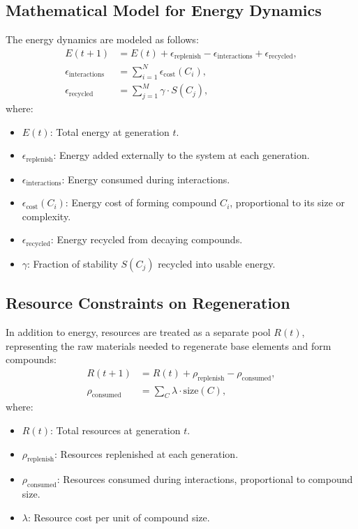 \documentclass[entropy,article,submit,pdftex,moreauthors]{Definitions/mdpi}
\begin{document}
\subsection{Mathematical Model for Energy Dynamics}

The energy dynamics are modeled as follows:
\begin{align}
E(t+1) &= E(t) + \epsilon_{\text{replenish}} - \epsilon_{\text{interactions}} + \epsilon_{\text{recycled}}, \\
\epsilon_{\text{interactions}} &= \sum_{i=1}^{N} \epsilon_{\text{cost}}(C_i), \\
\epsilon_{\text{recycled}} &= \sum_{j=1}^{M} \gamma \cdot S(C_j),
\end{align}
where:
\begin{itemize}
    \item \( E(t) \): Total energy at generation \( t \).
    \item \( \epsilon_{\text{replenish}} \): Energy added externally to the system at each generation.
    \item \( \epsilon_{\text{interactions}} \): Energy consumed during interactions.
    \item \( \epsilon_{\text{cost}}(C_i) \): Energy cost of forming compound \( C_i \), proportional to its size or complexity.
    \item \( \epsilon_{\text{recycled}} \): Energy recycled from decaying compounds.
    \item \( \gamma \): Fraction of stability \( S(C_j) \) recycled into usable energy.
\end{itemize}

\subsection{Resource Constraints on Regeneration}

In addition to energy, resources are treated as a separate pool \( R(t) \), representing the raw materials needed to regenerate base elements and form compounds:
\begin{align}
R(t+1) &= R(t) + \rho_{\text{replenish}} - \rho_{\text{consumed}}, \\
\rho_{\text{consumed}} &= \sum_{C} \lambda \cdot \text{size}(C),
\end{align}
where:
\begin{itemize}
    \item \( R(t) \): Total resources at generation \( t \).
    \item \( \rho_{\text{replenish}} \): Resources replenished at each generation.
    \item \( \rho_{\text{consumed}} \): Resources consumed during interactions, proportional to compound size.
    \item \( \lambda \): Resource cost per unit of compound size.
\end{itemize}
\end{document}

